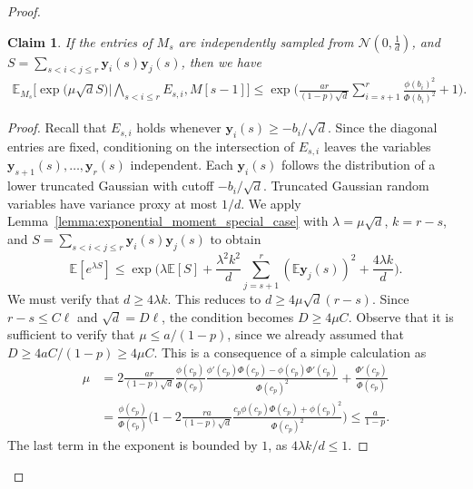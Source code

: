 \documentclass[11pt]{amsart}
\newtheorem{claim}[theorem]{\bf Claim}
\theoremstyle{definition}
\def\cN{\mathcal{N}}
\def\bE{\mathbb{E}}
\def\by{\boldsymbol{y}}
\begin{document}
\begin{proof}
\begin{claim}\label{claim:auxiliary_gaussian_appendix_blue}
If the entries of $M_s$ are independently sampled from $\cN(0, \frac{1}{d})$, and $S=\sum_{s<i<j\leq r}\by_i(s)\by_j(s)$, then we have
{\smaller[0.3]
\begin{align}
    \bE_{M_s}\bigg[\exp\bigg(\mu\sqrt{d}S\bigg)\bigg| \bigwedge_{s<i\leq r}\!\! E_{s, i}, M[s\!-\!1]\bigg]\leq  \exp\bigg(\frac{ar}{(1-p)\sqrt{d}}\sum_{i=s+1}^{r}\frac{\phi(b_i)^2}{\Phi(b_i)^2}+1\bigg).
\end{align}
}
\end{claim}
\begin{proof}
Recall that $E_{s, i}$ holds whenever $\by_i(s)\geq -b_i/\sqrt{d}$. Since the diagonal entries are fixed, conditioning on the intersection of $E_{s,i}$ leaves the variables $\by_{s+1}(s), \dots, \by_{r}(s)$ independent. Each $\by_i(s)$ follows the distribution of a lower truncated Gaussian with cutoff $-b_i/\sqrt{d}$.
Truncated Gaussian random variables have variance proxy at most $1/d$. We apply Lemma~\ref{lemma:exponential_moment_special_case} with $\lambda=\mu\sqrt{d}$, $k=r-s$, and $S=\sum_{s<i<j\leq r}\by_i(s)\by_j(s)$ to obtain
{\smaller[0.3]
\[\bE[e^{\lambda S}]\leq \exp\bigg( \lambda \bE[S] \!+\! \frac{\lambda^2k^2}{d}\sum_{j=s+1}^r (\bE \by_j(s))^2 \!+\!\frac{4\lambda k}{d}\bigg).\]
}
We must verify that $d\geq 4\lambda k$. This reduces to $d \geq 4 \mu\sqrt{d}(r-s)$. Since $r-s \leq C\ell$ and $\sqrt{d}=D\ell$, the condition becomes $D \geq 4\mu C$. Observe that it is sufficient to verify that $\mu\leq a/(1-p)$, since we already assumed that $D \geq 4aC/(1-p)\geq 4\mu C$. This is a consequence of a simple calculation as 
{\smaller[0.3]
\begin{align*}
\mu&=2\frac{ar}{(1-p)\sqrt{d}}\frac{\phi(c_p)}{\Phi(c_p)}\frac{\phi'(c_p)\Phi(c_p)-\phi(c_p)\Phi'(c_p)}{\Phi(c_p)^2}+\frac{\Phi'(c_p)}{\Phi(c_p)}\\
&=\frac{\phi(c_p)}{\Phi(c_p)}\Big(1-2\frac{ra}{(1-p)\sqrt{d}}\frac{c_p\phi(c_p)\Phi(c_p)+\phi(c_p)^2}{\Phi(c_p)^2}\Big)\leq \frac{a}{1-p}.
\end{align*}
}
The last term in the exponent is bounded by $1$, as $4\lambda k / d \leq 1$.


\end{proof}
\end{proof}
\end{document}
